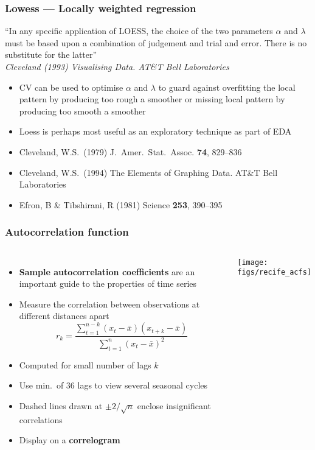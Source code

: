 \documentclass{beamer}
\begin{document}
\begin{frame}
    \frametitle{Lowess --- Locally weighted regression}
    ``In any specific application of LOESS, the choice of the two parameters $\alpha$ and $\lambda$ must be based upon a combination of judgement and trial and error. There is no substitute for the latter''\\
    \smallskip
    \emph{Cleveland (1993) Visualising Data. AT\&T Bell Laboratories}
    \medskip
    \begin{itemize}
        \item CV can be used to optimise $\alpha$ and $\lambda$ to guard against overfitting the local pattern by producing too rough a smoother or missing local pattern by producing too smooth a smoother
        \item Loess is perhaps most useful as an exploratory technique as part of EDA
        \item Cleveland, W.S.~(1979) J.~Amer.~Stat.~Assoc. \textbf{74}, 829--836
        \item Cleveland, W.S.~(1994) The Elements of Graphing Data. AT\&T Bell Laboratories
        \item Efron, B \& Tibshirani, R (1981) Science \textbf{253}, 390--395
    \end{itemize}
\end{frame}

\begin{frame}
\frametitle{Autocorrelation function}
\small
\begin{columns}
    \column{7cm}
    \begin{itemize}
        \item \textbf{Sample autocorrelation coefficients} are an important guide to the properties of time series
        \item Measure the correlation between observations at different distances apart
        $$r_k = \frac{\sum \limits^{n-k}_{t=1}(x_t - \bar{x})(x_{t+k} - \bar{x})}{\sum \limits^n_{t=1}(x_t-\bar{x})^2}$$
        \item Computed for small number of lags $k$
        \item Use min.~of 36 lags to view several seasonal cycles
        \item Dashed lines drawn at $\pm2 / \sqrt{n}$ enclose insignificant correlations
        \item Display on a \textbf{correlogram}
    \end{itemize}
    \column{5cm}
    \texttt{[image: figs/recife\_acfs]}
\end{columns}
\normalsize
\end{frame}
\end{document}

